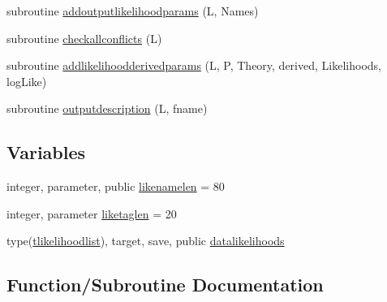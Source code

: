 \begin{DoxyCompactItemize}
\item 
subroutine \mbox{\hyperlink{namespacegeneraltypes_a67700a58507d793526ec1958d512cf71}{addoutputlikelihoodparams}} (L, Names)
\item 
subroutine \mbox{\hyperlink{namespacegeneraltypes_a6d294b5c4431a0f7a6537529c66b98f1}{checkallconflicts}} (L)
\item 
subroutine \mbox{\hyperlink{namespacegeneraltypes_a785618fc9b8db45522432952253e93a6}{addlikelihoodderivedparams}} (L, P, Theory, derived, Likelihoods, log\+Like)
\item 
subroutine \mbox{\hyperlink{namespacegeneraltypes_a99af409a28645f773f5a94f32df68365}{outputdescription}} (L, fname)
\end{DoxyCompactItemize}
\subsection*{Variables}
\begin{DoxyCompactItemize}
\item 
integer, parameter, public \mbox{\hyperlink{namespacegeneraltypes_ace8a6f4c868858b72f97b45b87312845}{likenamelen}} = 80
\item 
integer, parameter \mbox{\hyperlink{namespacegeneraltypes_aa0157fd48eed0fc43695836a0c19e1f0}{liketaglen}} = 20
\item 
type(\mbox{\hyperlink{structgeneraltypes_1_1tlikelihoodlist}{tlikelihoodlist}}), target, save, public \mbox{\hyperlink{namespacegeneraltypes_a2e2a79dda657e0a8910f724be0015ed5}{datalikelihoods}}
\end{DoxyCompactItemize}


\subsection{Function/\+Subroutine Documentation}
\mbox{\label{namespacegeneraltypes_a785618fc9b8db45522432952253e93a6}} 
